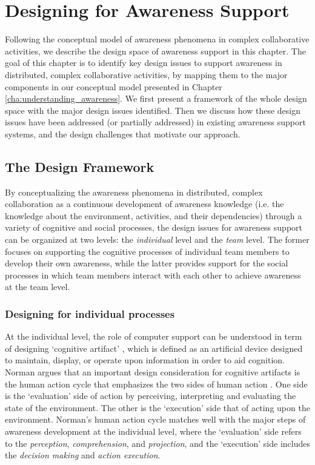 \graphicspath{{Figures/}}

\chapter{Designing for Awareness Support} %
\label{cha:designing_for_awareness_support}
Following the conceptual model of awareness phenomena in complex collaborative activities, we describe the design space of awareness support in this chapter. The goal of this chapter is to identify key design issues to support awareness in distributed, complex collaborative activities, by mapping them to the major components in our conceptual model presented in Chapter \ref{cha:understanding_awareness}. We first present a framework of the whole design space with the major design issues identified. Then we discuss how these design issues have been addressed (or partially addressed) in existing awareness support systems, and the design challenges that motivate our approach. 

\section{The Design Framework} %
\label{sec:the_design_space}
By conceptualizing the awareness phenomena in distributed, complex collaboration as a continuous development of awareness knowledge (i.e. the knowledge about the environment, activities, and their dependencies) through a variety of cognitive and social processes, the design issues for awareness support can be organized at two levels: the \emph{individual} level and the \emph{team} level. The former focuses on supporting the cognitive processes of individual team members to develop their own awareness, while the latter provides support for the social processes in which team members interact with each other to achieve awareness at the team level. 


\subsection{Designing for individual processes} %
\label{sub:designing_for_individuals}
At the individual level, the role of computer support can be understood in term of designing `cognitive artifact' \cite{Norman1992}, which is defined as an artificial device designed to maintain, display, or operate upon information in order to aid cognition. Norman argues that an important design consideration for cognitive artifacts is the human action cycle that emphasizes the two sides of human action \cite{Norman1992}. One side is the `evaluation' side of action by perceiving, interpreting and evaluating the state of the environment. The other is the `execution' side that of acting upon the environment. Norman's human action cycle matches well with the major steps of awareness development at the individual level, where the `evaluation' side refers to the \emph{perception}, \emph{comprehension}, and \emph{projection}, and the `execution' side includes the \emph{decision making} and \emph{action execution}.


